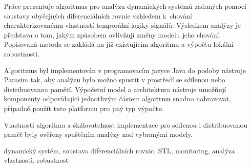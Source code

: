 \documentclass[11pt,twoside,utf8,final]{fithesis} %
\theoremstyle{plain}
\theoremstyle{definition}
\begin{document}
\begin{ThesisAbstract}
Práce prezentuje algoritmus pro analýzu dynamických systémů zadaných pomocí soustavy
obyčejných diferenciálních rovnic vzhledem k~cho\-vání charakterizovanému vlastností
temporální logiky signálů. Výsled\-kem a\-na\-lý\-zy je představa o tom,
jakým způsobem ovlivňují změny modelu jeho chování. Popisovaná metoda se zakládá
na již existujícím algoritmu a výpoč\-tu lokální robustnosti.

Algoritmus byl implementován v programovacím jazyce Java do podoby nástroje Parasim tak,
aby analýzu bylo možno spustit v prostředí se sdílenou nebo distribuovanou pamětí.
Výpočetní model a architektura nástroje umožňují komponenty odpovídající jednotlivým
částem algoritmu snadno nahrazovat, případně použít tuto platformu pro jiný typ
vý\-poč\-tu.

Vlastnosti algoritmu a škálovatelnost implementace pro sdílenou i distribuovanou paměť
byly ověřeny spuštěním analýzy nad vybranými modely.


\begin{comment}
The work presents an algorithm for the analysis of dynamic systems specified by the ordinary differential equations.
The system behavior is characterized by the formula of signal temporal logic. The result of the analysis is the idea of
how the changes affect the model's behavior. The described method is based on an existing algorithm and calculation of local robustnes.

The algorithm has been implemented in the Java programming language into the tool called Parasim
so that the analysis could be executed in an environment with shared or distributed memory.
Computational model and tool architecture allow components corresponding to parts of the algorithm
easy to replace, or use this platform to another type of calculation.

Properties of the algorithm implementation and scalability for both shared and
distributed memory has been verified by running analyzes on selected models.
\end{comment}

\end{ThesisAbstract}

\begin{ThesisKeyWords}
dynamický systém, soustava diferenciálních rovnic, STL, monitoring, analýza vlastnosti, robustnost
\end{ThesisKeyWords}

\MainMatter
\tableofcontents












\appendix





\end{document}

